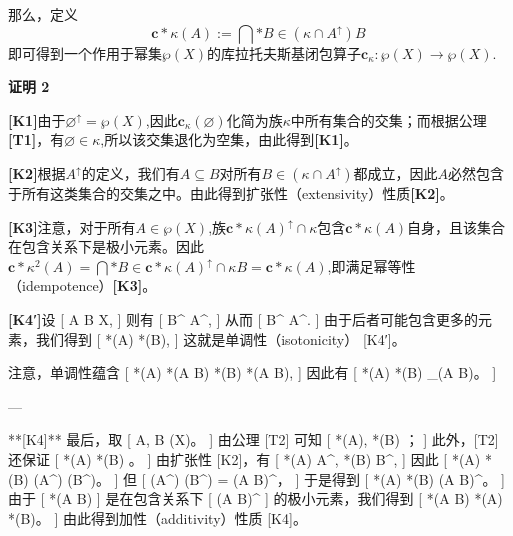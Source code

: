 那么，定义
$$
\mathbf{c}*{\kappa}(A) := \bigcap*{B \in (\kappa \cap A^{\uparrow})} B~
$$
即可得到一个作用于幂集$\wp(X)$的库拉托夫斯基闭包算子$\mathbf{c}_{\kappa} : \wp(X) \to \wp(X)$.

\textbf{证明 2}

\textbf{[K1]}由于$\varnothing^{\uparrow} = \wp(X)$,因此$\mathbf{c}_{\kappa}(\varnothing)$化简为族$\kappa$中所有集合的交集；而根据公理\textbf{[T1]}，有$\varnothing \in \kappa$,所以该交集退化为空集，由此得到\textbf{[K1]}。

\textbf{[K2]}根据$A^{\uparrow}$的定义，我们有$A \subseteq B$对所有$B \in (\kappa \cap A^{\uparrow})$都成立，因此$A$必然包含于所有这类集合的交集之中。由此得到扩张性（extensivity）性质\textbf{[K2]}。

\textbf{[K3]}注意，对于所有$A \in \wp(X)$,族$\mathbf{c}*{\kappa}(A)^{\uparrow} \cap \kappa$包含$\mathbf{c}*{\kappa}(A)$自身，且该集合在包含关系下是极小元素。因此$\mathbf{c}*{\kappa}^{2}(A)= \bigcap*{B \in \mathbf{c}*{\kappa}(A)^{\uparrow} \cap \kappa} B= \mathbf{c}*{\kappa}(A)$,即满足幂等性（idempotence）\textbf{[K3]}。

\textbf{[K4′]}设
[
A \subseteq B \subseteq X,
]
则有
[
B^{\uparrow} \subseteq A^{\uparrow},
]
从而
[
\kappa \cap B^{\uparrow} \subseteq \kappa \cap A^{\uparrow}.
]
由于后者可能包含更多的元素，我们得到
[
*{\kappa}(A) \subseteq {}*{\kappa}(B),
]
这就是单调性（isotonicity） [K4′]。

注意，单调性蕴含
[
*{\kappa}(A) \subseteq {}*{\kappa}(A \cup B)
\quad{}\quad
{}*{\kappa}(B) \subseteq {}*{\kappa}(A \cup B),
]
因此有
[
*{\kappa}(A) \cup {}*{\kappa}(B) \subseteq {}_{\kappa}(A \cup B)。
]

---

**[K4]** 最后，取
[
A, B \in \wp(X)。
]
由公理 [T2] 可知
[
*{\kappa}(A), *{\kappa}(B) \in \kappa；
]
此外，[T2] 还保证
[
*{\kappa}(A) \cup {}*{\kappa}(B) \in \kappa。
]
由扩张性 [K2]，有
[
*{\kappa}(A) \in A^{\uparrow}, \quad
{}*{\kappa}(B) \in B^{\uparrow},
]
因此
[
*{\kappa}(A) \cup {}*{\kappa}(B) \in (A^{\uparrow}) \cap (B^{\uparrow})。
]
但
[
(A^{\uparrow}) \cap (B^{\uparrow}) = (A \cup B)^{\uparrow}，
]
于是得到
[
*{\kappa}(A) \cup {}*{\kappa}(B) \in \kappa \cap (A \cup B)^{\uparrow}。
]
由于
[
*{\kappa}(A \cup B)
]
是在包含关系下
[
\kappa \cap (A \cup B)^{\uparrow}
]
的极小元素，我们得到
[
*{\kappa}(A \cup B) \subseteq {}*{\kappa}(A) \cup {}*{\kappa}(B)。
]
由此得到加性（additivity）性质 [K4]。
